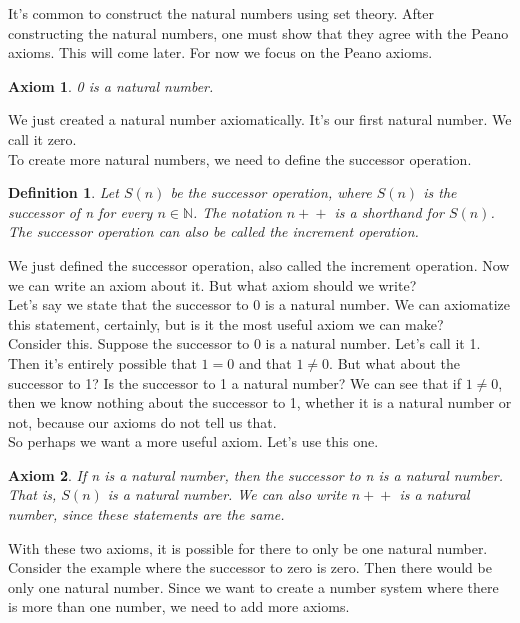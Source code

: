 \documentclass{article}
\newtheorem{axiom}{Axiom}
\newtheorem{definition}{Definition}
\newcommand{\inc}[1]{#1\!+\!+}
\begin{document}
It's common to construct the natural numbers using set theory. After constructing the natural numbers, one must show that they agree with the Peano axioms. This will come later. For now we focus on the Peano axioms.

\begin{axiom}
0 is a natural number.
\end{axiom}

We just created a natural number axiomatically. It's our first natural number. We call it zero. \\

To create more natural numbers, we need to define the successor operation.

\begin{definition}
Let $S(n)$ be the successor operation, where $S(n)$ is the successor of n for every $n \in \mathbb{N}$. The notation $\inc{n}$ is a shorthand for $S(n)$. The successor operation can also be called the increment operation.
\end{definition}

We just defined the successor operation, also called the increment operation. Now we can write an axiom about it. But what axiom should we write? \\

Let's say we state that the successor to 0 is a natural number. We can axiomatize this statement, certainly, but is it the most useful axiom we can make? \\

Consider this. Suppose the successor to 0 is a natural number. Let's call it 1. Then it's entirely possible that $1 = 0$ and that $1 \neq 0$. But what about the successor to 1? Is the successor to 1 a natural number? We can see that if $1 \neq 0$, then we know nothing about the successor to 1, whether it is a natural number or not, because our axioms do not tell us that. \\

So perhaps we want a more useful axiom. Let's use this one. 

\begin{axiom}
If n is a natural number, then the successor to n is a natural number. That is, $S(n)$ is a natural number. We can also write $\inc{n}$ is a natural number, since these statements are the same.
\end{axiom}

With these two axioms, it is possible for there to only be one natural number. Consider the example where the successor to zero is zero. Then there would be only one natural number. Since we want to create a number system where there is more than one number, we need to add more axioms.
\end{document}
